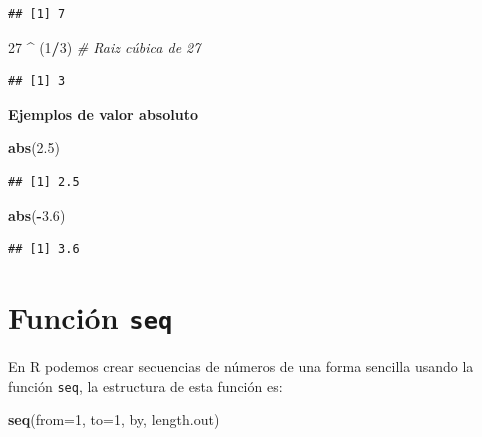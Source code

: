 \documentclass[10pt,]{krantz}
\makeatletter
\newenvironment{Shaded}{\begin{snugshade}}{\end{snugshade}}
\newcommand{\KeywordTok}[1]{\textcolor[rgb]{0.13,0.29,0.53}{\textbf{#1}}}
\newcommand{\DataTypeTok}[1]{\textcolor[rgb]{0.13,0.29,0.53}{#1}}
\newcommand{\DecValTok}[1]{\textcolor[rgb]{0.00,0.00,0.81}{#1}}
\newcommand{\FloatTok}[1]{\textcolor[rgb]{0.00,0.00,0.81}{#1}}
\newcommand{\StringTok}[1]{\textcolor[rgb]{0.31,0.60,0.02}{#1}}
\newcommand{\CommentTok}[1]{\textcolor[rgb]{0.56,0.35,0.01}{\textit{#1}}}
\newcommand{\OperatorTok}[1]{\textcolor[rgb]{0.81,0.36,0.00}{\textbf{#1}}}
\newcommand{\NormalTok}[1]{#1}
\let\proglang=\textsf
\newenvironment{kframe}{%
\medskip{}
\setlength{\fboxsep}{.8em}
 \def\at@end@of@kframe{}%
 \ifinner\ifhmode%
  \def\at@end@of@kframe{\end{minipage}}%
  \begin{minipage}{\columnwidth}%
 \fi\fi%
 \def\FrameCommand##1{\hskip\@totalleftmargin \hskip-\fboxsep
 \colorbox{shadecolor}{##1}\hskip-\fboxsep
     \hskip-\linewidth \hskip-\@totalleftmargin \hskip\columnwidth}%
 \MakeFramed {\advance\hsize-\width
   \@totalleftmargin\z@ \linewidth\hsize
   \@setminipage}}%
 {\par\unskip\endMakeFramed%
 \at@end@of@kframe}
\renewenvironment{Shaded}{\begin{kframe}}{\end{kframe}}
\makeatother
\begin{document}
\begin{verbatim}
## [1] 7
\end{verbatim}

\begin{Shaded}
\begin{Highlighting}[]
\DecValTok{27} \OperatorTok{^}\StringTok{ }\NormalTok{(}\DecValTok{1}\OperatorTok{/}\DecValTok{3}\NormalTok{)  }\CommentTok{# Raiz cúbica de 27}
\end{Highlighting}
\end{Shaded}

\begin{verbatim}
## [1] 3
\end{verbatim}

\textbf{Ejemplos de valor absoluto}

\begin{Shaded}
\begin{Highlighting}[]
\KeywordTok{abs}\NormalTok{(}\FloatTok{2.5}\NormalTok{)}
\end{Highlighting}
\end{Shaded}

\begin{verbatim}
## [1] 2.5
\end{verbatim}

\begin{Shaded}
\begin{Highlighting}[]
\KeywordTok{abs}\NormalTok{(}\OperatorTok{-}\FloatTok{3.6}\NormalTok{)}
\end{Highlighting}
\end{Shaded}

\begin{verbatim}
## [1] 3.6
\end{verbatim}

\section{\texorpdfstring{Función \texttt{seq} 
}{Función seq  }}\label{funcion-seq}

En \proglang{R} podemos crear secuencias de números de una forma
sencilla usando la función \texttt{seq}, la estructura de esta función
es:

\begin{Shaded}
\begin{Highlighting}[]
\KeywordTok{seq}\NormalTok{(}\DataTypeTok{from=}\DecValTok{1}\NormalTok{, }\DataTypeTok{to=}\DecValTok{1}\NormalTok{, by, length.out)}
\end{Highlighting}
\end{Shaded}
\end{document}
